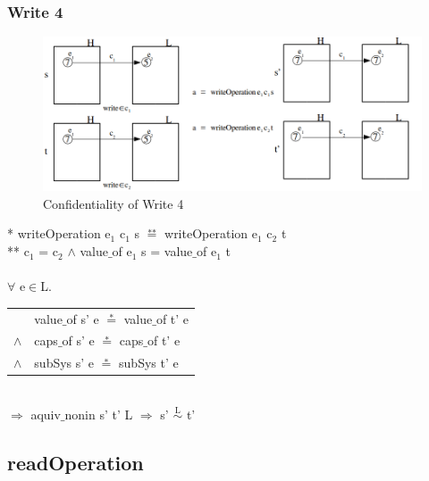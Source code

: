\documentclass[pdftex,11pt,a4paper]{article}
\begin{document}
\subsubsection{Write 4}\label{sec:Write 4}
\begin{figure}[H]
		\includegraphics[width=1.1\textwidth]{./Pictures/write4Confidentality.png}
		\caption[Confidentiality of Write 4]{Confidentiality of Write 4}
	\label{fig:write4}
\end{figure}
* writeOperation e$_1$ c$_1$ s $\overset{\text{**}}{=}$ writeOperation e$_1$ c$_2$ t \\
** c$_1$ = c$_2$ $\wedge$ value$\_$of e$_1$ s = value$\_$of e$_1$ t \\ \\
$\forall$ e$\in$L. \\
\begin{tabular}{ll}
& value$\_$of s' e $\overset{\text{*}}{=}$  value$\_$of t' e \\
$\wedge$ & caps$\_$of s' e $\overset{\text{*}}{=}$ caps$\_$of t' e \\
$\wedge$ & subSys s' e $\overset{\text{*}}{=}$ subSys t' e
\end{tabular} \\
$\Rightarrow$ aquiv$\_$nonin s' t' L $\Rightarrow$ s' $\overset{\text{L}}{\sim}$ t' 
\subsection{readOperation}
\end{document}
